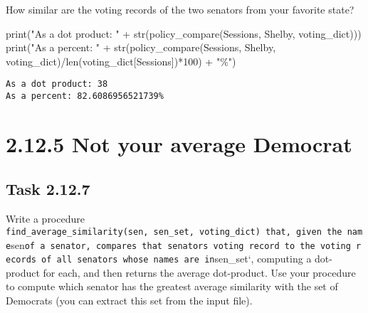 \documentclass[
  letterpaper,
  DIV=11,
  numbers=noendperiod]{scrartcl}
\newenvironment{Shaded}{\begin{snugshade}}{\end{snugshade}}
\newcommand{\BuiltInTok}[1]{\textcolor[rgb]{0.00,0.23,0.31}{#1}}
\newcommand{\DecValTok}[1]{\textcolor[rgb]{0.68,0.00,0.00}{#1}}
\newcommand{\NormalTok}[1]{\textcolor[rgb]{0.00,0.23,0.31}{#1}}
\newcommand{\OperatorTok}[1]{\textcolor[rgb]{0.37,0.37,0.37}{#1}}
\newcommand{\StringTok}[1]{\textcolor[rgb]{0.13,0.47,0.30}{#1}}
\begin{document}
How similar are the voting records of the two senators from your
favorite state?

\begin{Shaded}
\begin{Highlighting}[numbers=left,,]
\BuiltInTok{print}\NormalTok{(}\StringTok{"As a dot product: "} \OperatorTok{+} \BuiltInTok{str}\NormalTok{(policy\_compare(}\StringTok{\textquotesingle{}Sessions\textquotesingle{}}\NormalTok{, }\StringTok{\textquotesingle{}Shelby\textquotesingle{}}\NormalTok{, voting\_dict)))}
\BuiltInTok{print}\NormalTok{(}\StringTok{"As a percent: "} \OperatorTok{+} \BuiltInTok{str}\NormalTok{(policy\_compare(}\StringTok{\textquotesingle{}Sessions\textquotesingle{}}\NormalTok{, }\StringTok{\textquotesingle{}Shelby\textquotesingle{}}\NormalTok{, voting\_dict)}\OperatorTok{/}\BuiltInTok{len}\NormalTok{(voting\_dict[}\StringTok{\textquotesingle{}Sessions\textquotesingle{}}\NormalTok{])}\OperatorTok{*}\DecValTok{100}\NormalTok{) }\OperatorTok{+} \StringTok{"\%"}\NormalTok{)}
\end{Highlighting}
\end{Shaded}

\begin{verbatim}
As a dot product: 38
As a percent: 82.6086956521739%
\end{verbatim}

\hypertarget{not-your-average-democrat}{%
\section{2.12.5 Not your average
Democrat}\label{not-your-average-democrat}}

\hypertarget{task-2.12.7}{%
\subsection{Task 2.12.7}\label{task-2.12.7}}

Write a procedure
\texttt{find\_average\_similarity(sen,\ sen\_set,\ voting\_dict)\ that,\ given\ the\ name}sen\texttt{of\ a\ senator,\ compares\ that\ senator\textquotesingle{}s\ voting\ record\ to\ the\ voting\ records\ of\ all\ senators\ whose\ names\ are\ in}sen\_set`,
computing a dot-product for each, and then returns the average
dot-product. Use your procedure to compute which senator has the
greatest average similarity with the set of Democrats (you can extract
this set from the input file).
\end{document}
